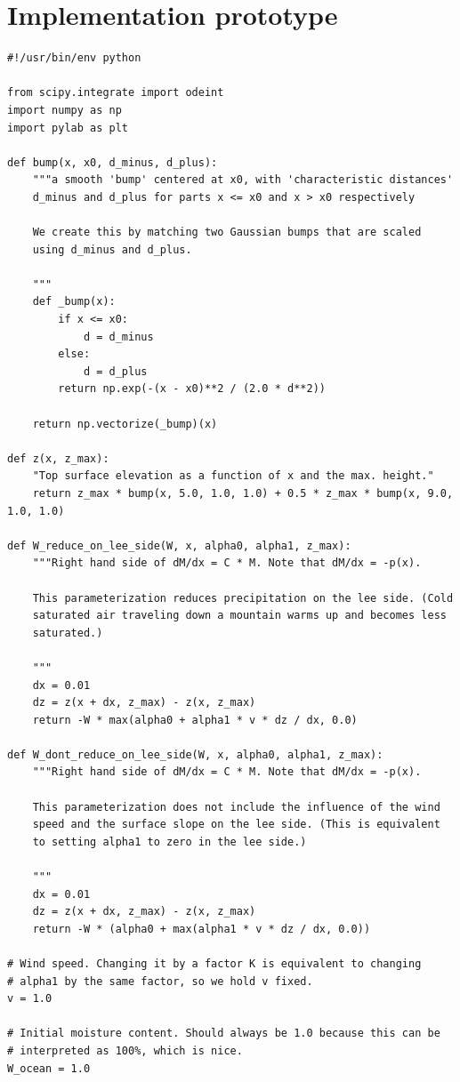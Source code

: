 \documentclass[11pt]{article}
\begin{document}
\section{Implementation prototype}
\label{sec-2}
\begin{verbatim}
#!/usr/bin/env python

from scipy.integrate import odeint
import numpy as np
import pylab as plt

def bump(x, x0, d_minus, d_plus):
    """a smooth 'bump' centered at x0, with 'characteristic distances'
    d_minus and d_plus for parts x <= x0 and x > x0 respectively

    We create this by matching two Gaussian bumps that are scaled
    using d_minus and d_plus.

    """
    def _bump(x):
        if x <= x0:
            d = d_minus
        else:
            d = d_plus
        return np.exp(-(x - x0)**2 / (2.0 * d**2))

    return np.vectorize(_bump)(x)

def z(x, z_max):
    "Top surface elevation as a function of x and the max. height."
    return z_max * bump(x, 5.0, 1.0, 1.0) + 0.5 * z_max * bump(x, 9.0, 1.0, 1.0)

def W_reduce_on_lee_side(W, x, alpha0, alpha1, z_max):
    """Right hand side of dM/dx = C * M. Note that dM/dx = -p(x).

    This parameterization reduces precipitation on the lee side. (Cold
    saturated air traveling down a mountain warms up and becomes less
    saturated.)

    """
    dx = 0.01
    dz = z(x + dx, z_max) - z(x, z_max)
    return -W * max(alpha0 + alpha1 * v * dz / dx, 0.0)

def W_dont_reduce_on_lee_side(W, x, alpha0, alpha1, z_max):
    """Right hand side of dM/dx = C * M. Note that dM/dx = -p(x).

    This parameterization does not include the influence of the wind
    speed and the surface slope on the lee side. (This is equivalent
    to setting alpha1 to zero in the lee side.)

    """
    dx = 0.01
    dz = z(x + dx, z_max) - z(x, z_max)
    return -W * (alpha0 + max(alpha1 * v * dz / dx, 0.0))

# Wind speed. Changing it by a factor K is equivalent to changing
# alpha1 by the same factor, so we hold v fixed.
v = 1.0

# Initial moisture content. Should always be 1.0 because this can be
# interpreted as 100%, which is nice.
W_ocean = 1.0


\end{verbatim}
\end{document}
